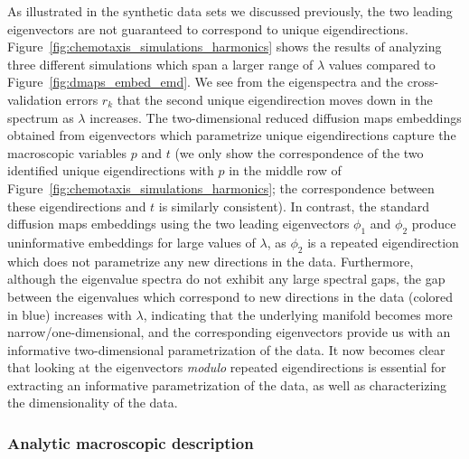 As illustrated in the synthetic data sets we discussed previously, the two leading eigenvectors are not guaranteed to correspond to unique eigendirections.
%
Figure~\ref{fig:chemotaxis_simulations_harmonics} shows the results of analyzing three different simulations which span a larger range of $\lambda$ values compared to Figure~\ref{fig:dmaps_embed_emd}.
%
We see from the eigenspectra and the cross-validation errors $r_k$ that the second unique eigendirection moves down in the spectrum as $\lambda$ increases.
%
The two-dimensional reduced diffusion maps embeddings obtained from eigenvectors which parametrize unique eigendirections capture the macroscopic variables $p$ and $t$ (we only show the correspondence of the two identified unique eigendirections with $p$ in the middle row of Figure~\ref{fig:chemotaxis_simulations_harmonics}; the correspondence between these eigendirections and $t$ is similarly consistent).
%
In contrast, the standard diffusion maps embeddings using the two leading eigenvectors $\phi_1$ and $\phi_2$ produce uninformative embeddings for large values of $\lambda$, as $\phi_2$ is a repeated eigendirection which does not parametrize any new directions in the data.
%
Furthermore, although the eigenvalue spectra do not exhibit any large spectral gaps, the gap between the eigenvalues which correspond to new directions in the data (colored in blue) increases with $\lambda$, indicating that the underlying manifold becomes more narrow/one-dimensional, and the corresponding eigenvectors provide us with an informative two-dimensional parametrization of the data. %
%
It now becomes clear that looking at the eigenvectors {\em modulo} repeated eigendirections is essential for extracting an informative parametrization of the data, as well as characterizing the dimensionality of the data.

\subsubsection{Analytic macroscopic description}

